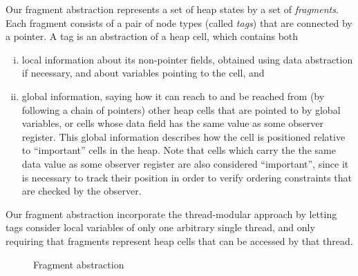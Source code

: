 Our fragment abstraction represents a set of heap states by
a set of {\em fragments}. Each fragment consists of
a pair of node types (called {\em tags}) that are connected by a pointer.
A tag is an abstraction of a heap cell, which contains both 
\begin{enumerate}[(i)]
\item
  local information about its non-pointer fields, obtained
  using data abstraction if necessary, and about variables pointing to the
  cell, and
 \item
   global information, saying how
it can reach to and be reached from (by following a chain of pointers)
other heap cells that are pointed to by global variables, or cells whose
data field has the same value as some observer register.
This global information describes how the cell is positioned relative to
``important'' cells in the heap. Note that 
cells which carry the the same data value as some observer register are also
considered ``important'', since it is necessary to track their position in 
order to verify ordering constraints that are checked by the observer.
\end{enumerate}
Our fragment abstraction incorporate the thread-modular approach by letting
tags consider local variables of only one arbitrary single thread, and
only requiring that fragments represent heap cells that can be accessed by
that thread.

\begin{figure}
	
\caption{Fragment abstraction}
\label{fig:tsviewshape}
\end{figure} 

